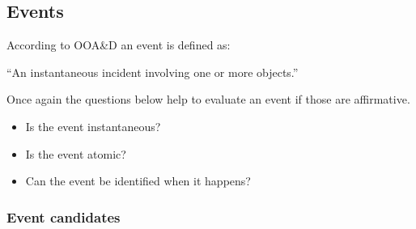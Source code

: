 \subsection{Events}

According to OOA\&D an event is defined as\citep[p.~53]{Rod-Aalborg}:

``An instantaneous incident involving one or more objects.''

Once again the questions below help to evaluate an event if those are affirmative\citep[p.~65]{Rod-Aalborg}.
\begin{itemize}
	\item Is the event instantaneous?
	\item Is the event atomic?
	\item Can the event be identified when it happens?
\end{itemize}




\subsubsection{Event candidates}


